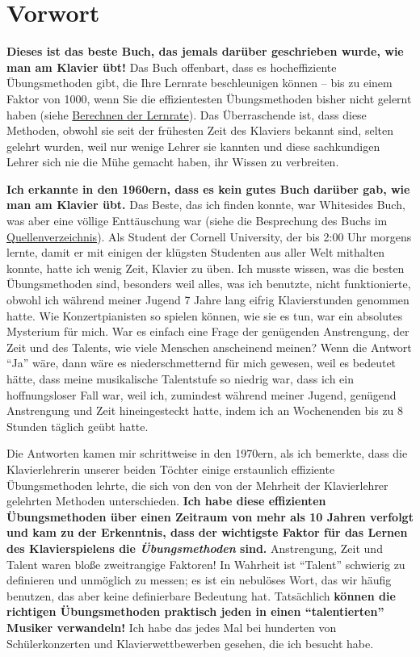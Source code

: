 
\section*{Vorwort}
\label{preface}


\textbf{Dieses ist das beste Buch, das jemals darüber geschrieben wurde, wie man am Klavier übt!}
Das Buch offenbart, dass es hocheffiziente Übungsmethoden gibt, die Ihre Lernrate beschleunigen können -- bis zu einem Faktor von 1000, wenn Sie die effizientesten Übungsmethoden bisher nicht gelernt haben (siehe \hyperref[c1iv5]{Berechnen der Lernrate}).
Das Überraschende ist, dass diese Methoden, obwohl sie seit der frühesten Zeit des Klaviers bekannt sind, selten gelehrt wurden, weil nur wenige Lehrer sie kannten und diese sachkundigen Lehrer sich nie die Mühe gemacht haben, ihr Wissen zu verbreiten.

\textbf{Ich erkannte in den 1960ern, dass es kein gutes Buch darüber gab, wie man am Klavier übt.}
Das Beste, das ich finden konnte, war Whitesides Buch, was aber eine völlige Enttäuschung war (siehe die Besprechung des Buchs im \hyperref[Whiteside]{Quellenverzeichnis}).
Als Student der Cornell University, der bis 2:00 Uhr morgens lernte, damit er mit einigen der klügsten Studenten aus aller Welt mithalten konnte, hatte ich wenig Zeit, Klavier zu üben.
Ich musste wissen, was die besten Übungsmethoden sind, besonders weil alles, was ich benutzte, nicht funktionierte, obwohl ich während meiner Jugend 7 Jahre lang eifrig Klavierstunden genommen hatte.
Wie Konzertpianisten so spielen können, wie sie es tun, war ein absolutes Mysterium für mich.
War es einfach eine Frage der genügenden Anstrengung, der Zeit und des Talents, wie viele Menschen anscheinend meinen?
Wenn die Antwort \enquote{Ja} wäre, dann wäre es niederschmetternd für mich gewesen, weil es bedeutet hätte, dass meine musikalische Talentstufe so niedrig war, dass ich ein hoffnungsloser Fall war, weil ich, zumindest während meiner Jugend, genügend Anstrengung und Zeit hineingesteckt hatte, indem ich an Wochenenden bis zu 8 Stunden täglich geübt hatte.

Die Antworten kamen mir schrittweise in den 1970ern, als ich bemerkte, dass die Klavierlehrerin unserer beiden Töchter einige erstaunlich effiziente Übungsmethoden lehrte, die sich von den von der Mehrheit der Klavierlehrer gelehrten Methoden unterschieden.
\textbf{Ich habe diese effizienten Übungsmethoden über einen Zeitraum von mehr als 10 Jahren verfolgt und kam zu der Erkenntnis, dass der wichtigste Faktor für das Lernen des Klavierspielens die \textit{Übungsmethoden} sind.}
Anstrengung, Zeit und Talent waren bloße zweitrangige Faktoren!
In Wahrheit ist \enquote{Talent} schwierig zu definieren und unmöglich zu messen; es ist ein nebulöses Wort, das wir häufig benutzen, das aber keine definierbare Bedeutung hat.
Tatsächlich \textbf{können die richtigen Übungsmethoden praktisch jeden in einen \enquote{talentierten} Musiker verwandeln!}
Ich habe das jedes Mal bei hunderten von Schülerkonzerten und Klavierwettbewerben gesehen, die ich besucht habe.

